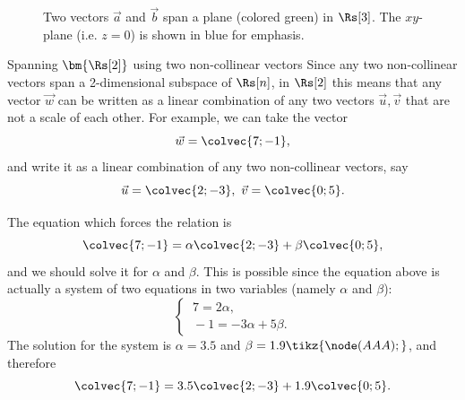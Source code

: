 \begin{figure}
	\centering
	\caption{Two vectors $\vec{a}$ and $\vec{b}$ span a plane (colored green) in $\Rs[3]$. The $xy$-plane (i.e. $z=0$) is shown in blue for emphasis.}
	\label{fig:span of two vectors}
\end{figure}

\begin{example}{Spanning $\bm{\Rs[2]}$ using two non-collinear vectors}{}
	Since any two non-collinear vectors span a 2-dimensional subspace of $\Rs[n]$, in $\Rs[2]$ this means that any vector $\vec{w}$ can be written as a linear combination of any two vectors $\vec{u},\vec{v}$ that are not a scale of each other. For example, we can take the vector
	\[
		\vec{w} = \colvec{7;-1},
	\]
	and write it as a linear combination of any two non-collinear vectors, say
	\[
		\vec{u}=\colvec{2;-3},\ \vec{v}=\colvec{0;5}.
	\]

	The equation which forces the relation is
	\[
		\colvec{7;-1} = \alpha\colvec{2;-3} + \beta\colvec{0;5},
	\]
	and we should solve it for $\alpha$ and $\beta$. This is possible since the equation above is actually a system of two equations in two variables (namely $\alpha$ and $\beta$):
	\[
		\begin{cases}
			\ 7  = 2\alpha,\\
			\ -1 = -3\alpha + 5\beta.
		\end{cases}
	\]
	The solution for the system is $\alpha=3.5$ and $\beta=1.9\tikz{\node(AAA){};}$, and therefore
	\[
		\colvec{7;-1} = 3.5\colvec{2;-3} + 1.9\colvec{0;5}.
	\]
\end{example}

